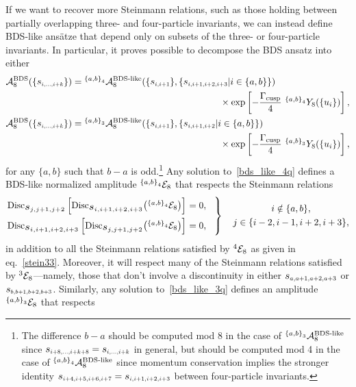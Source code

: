 \documentclass[11pt]{article}
\def\mand#1{\scaleto{s}{4.6pt}_{\scaleto{#1}{5.2pt}}}
\def\EthreeJ{{}^{{\{a,b\}}_3} {\cal E}_8}
\def\EfourJ{{}^{{\{a,b\}}_4} {\cal E}_8}
\begin{document}
If we want to recover more Steinmann relations, such as those holding between partially overlapping three- and four-particle invariants, we can instead define BDS-like ans\"atze that depend only on subsets of the three- or four-particle invariants. In particular, it proves possible to decompose the BDS ansatz into either
\begin{align}
{\cal A}_8^{\text{BDS}}(\{\mand{i,\dots,i+k}\}) &= {}^{{\{a,b\}}_4} {\cal A}_8^{\text{BDS-like}}(\{\mand{i,i+1}\}, \{\mand{i,i+1,i+2,i+3} | i \in \{a,b\} \})  \label{bds_like_4q} \\ 
&\hspace{5.6cm} \times \exp \left[ - \frac{\Gamma_{\text{cusp}}}{4}\ {}^{{\{a,b\}}_4} Y_{8}(\{u_i\})  \right], \nonumber  \\
{\cal A}_8^{\text{BDS}}(\{\mand{i,\dots,i+k}\}) &= {}^{{\{a,b\}}_3} {\cal A}_8^{\text{BDS-like}}(\{\mand{i,i+1}\}, \{\mand{i,i+1,i+2} | i \in \{a,b\} \})  \label{bds_like_3q} \\ 
&\hspace{5.6cm} \times \exp \left[ - \frac{\Gamma_{\text{cusp}}}{4}\ {}^{{\{a,b\}}_3} Y_{8}(\{u_i\})  \right], \nonumber 
\end{align}
for any $\{a,b\}$ such that $b-a$ is odd.\footnote{The difference $b-a$ should be computed mod 8 in the case of ${}^{{\{a,b\}}_3} {\cal A}_8^{\text{BDS-like}}$ since $\mand{i+8,\dots,i+k+8} = \mand{i,\dots,i+k}$ in general, but should be computed mod 4 in the case of ${}^{{\{a,b\}}_4} {\cal A}_8^{\text{BDS-like}}$ since momentum conservation implies the stronger identity $\mand{i+4,i+5,i+6,i+7} = \mand{i,i+1,i+2,i+3}$ between four-particle invariants.} Any solution to~\eqref{bds_like_4q} defines a BDS-like normalized amplitude $\EfourJ$ that respects the Steinmann relations
\begin{equation}
\begin{rcases}
\text{Disc}_{\mand{j,j+1,j+2}}\left[\text{Disc}_{\mand{i,i+1,i+2,i+3}} \big(\EfourJ \big) \right] \! \! \! \! &= 0, \hspace{.3cm} \\
\text{Disc}_{\mand{i,i+1,i+2,i+3}}\left[\text{Disc}_{\mand{j,j+1,j+2}} \big(\EfourJ \big) \right] \! \! \! \! &= 0, \label{stein34}
\end{rcases} \quad 
\begin{gathered} i \notin \{a,b\}, \\ j \in \{i-2, i-1, i+2, i+3\}, \end{gathered}
\end{equation}
in addition to all the Steinmann relations satisfied by ${}^4 {\cal E}_8$ as given in eq.~\eqref{stein33}. Moreover, it will respect many of the Steinmann relations satisfied by ${}^3 {\cal E}_8$---namely, those that don't involve a discontinuity in either $\mand{a,a+1,a+2,a+3}$ or $\mand{b,b+1,b+2,b+3}$. Similarly, any solution to~\eqref{bds_like_3q} defines an amplitude $\EthreeJ$ that respects
\end{document}
